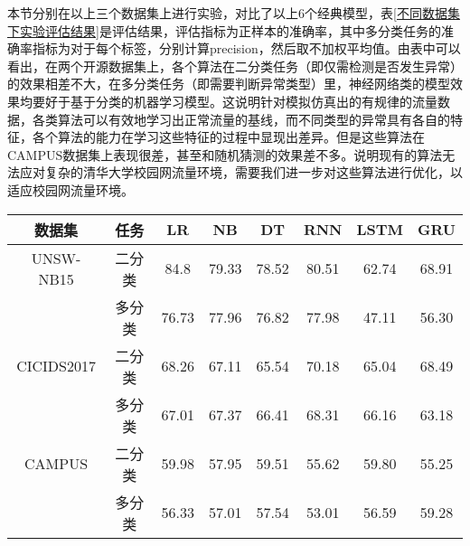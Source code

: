 本节分别在以上三个数据集上进行实验，对比了以上6个经典模型，表\ref{不同数据集下实验评估结果}是评估结果，评估指标为正样本的准确率，其中多分类任务的准确率指标为对于每个标签，分别计算precision，然后取不加权平均值。由表中可以看出，在两个开源数据集上，各个算法在二分类任务（即仅需检测是否发生异常）的效果相差不大，在多分类任务（即需要判断异常类型）里，神经网络类的模型效果均要好于基于分类的机器学习模型。这说明针对模拟仿真出的有规律的流量数据，各类算法可以有效地学习出正常流量的基线，而不同类型的异常具有各自的特征，各个算法的能力在学习这些特征的过程中显现出差异。但是这些算法在CAMPUS数据集上表现很差，甚至和随机猜测的效果差不多。说明现有的算法无法应对复杂的清华大学校园网流量环境，需要我们进一步对这些算法进行优化，以适应校园网流量环境。




\begin{table*}[h]
    \small
    \caption{不同数据集下实验评估结果}
    \label{不同数据集下实验评估结果}
    \centering
    \begin{tabular}{c|c|ccc|ccc}
    \toprule
    
     数据集 &  任务  &  
     LR &  NB & DT & RNN & LSTM & GRU  \\
    \midrule
    
    UNSW-NB15 & 二分类 & 84.8 & 79.33 & 78.52 &  80.51 & 62.74 & 68.91  \\ 
    
    & 多分类 &76.73 & 77.96 & 76.82 & 77.98 & 47.11 & 56.30  \\
    
    \midrule
    CICIDS2017 & 二分类 & 68.26 & 67.11 & 65.54 & 70.18 & 65.04 & 68.49  \\
    & 多分类 & 67.01 & 67.37 & 66.41 & 68.31 & 66.16 & 63.18 \\
    \midrule
    CAMPUS & 二分类 & 59.98 & 57.95 & 59.51 & 55.62 & 59.80 & 55.25 \\
    & 多分类 & 56.33 & 57.01 & 57.54 & 53.01 & 56.59 & 59.28 \\
   
     \bottomrule
    
    \end{tabular}
    \end{table*}
